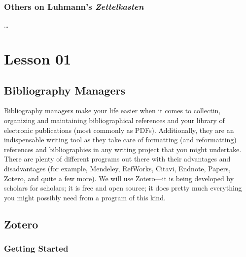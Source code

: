 \documentclass[
]{book}
\begin{document}
\hypertarget{others-on-luhmanns-zettelkasten}{%
\subsection*{\texorpdfstring{Others on Luhmann's \emph{Zettelkasten}}{Others on Luhmann's Zettelkasten}}\label{others-on-luhmanns-zettelkasten}}

\ldots{}

\hypertarget{lesson-01}{%
\chapter{Lesson 01}\label{lesson-01}}

\hypertarget{bibliography-managers}{%
\section{Bibliography Managers}\label{bibliography-managers}}

Bibliography managers make your life easier when it comes to collectin, organizing and maintaining bibliographical references and your library of electronic publications (most commonly as PDFs). Additionally, they are an indispensable writing tool as they take care of formatting (and reformatting) references and bibliographies in any writing project that you might undertake. There are plenty of different programs out there with their advantages and disadvantages (for example, Mendeley, RefWorks, Citavi, Endnote, Papers, Zotero, and quite a few more). We will use Zotero---it is being developed by scholars for scholars; it is free and open source; it does pretty much everything you might possibly need from a program of this kind.

\hypertarget{zotero}{%
\section{Zotero}\label{zotero}}

\hypertarget{getting-started}{%
\subsection{Getting Started}\label{getting-started}}
\end{document}
